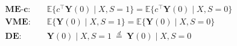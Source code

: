 \documentclass[border=8pt]{standalone}
\begin{document}
$\displaystyle \begin{aligned} \textbf{ME-}\bm{c}:&\quad \mathbb{E}\{c^{\top}\bm Y(0)\mid X,S{=}1\}=\mathbb{E}\{c^{\top}\bm Y(0)\mid X,S{=}0\}\\[2pt] \textbf{VME}:&\quad \mathbb{E}\{\bm Y(0)\mid X,S{=}1\}=\mathbb{E}\{\bm Y(0)\mid X,S{=}0\}\\[2pt] \textbf{DE}:&\quad \bm Y(0)\mid X,S{=}1\ \overset{d}{=}\ \bm Y(0)\mid X,S{=}0 \end{aligned}$
\end{document}
